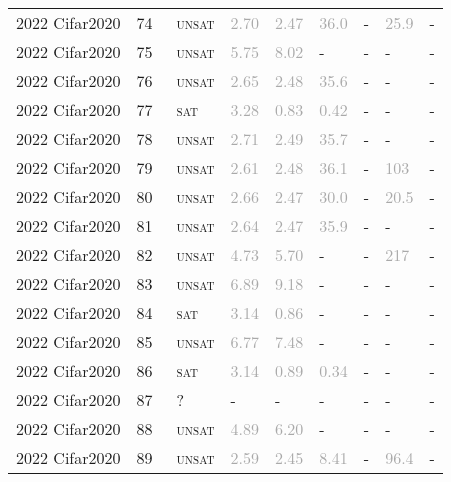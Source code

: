 \begin{center}
{\begin{longtable}{@{}lllllllll@{}}
2022 Cifar2020 & 74 & ~\textsc{unsat} & \textcolor{darkgray}{2.70} & \textcolor{darkgray}{2.47} & \textcolor{darkgray}{36.0} & - & \textcolor{darkgray}{25.9} & - \\
2022 Cifar2020 & 75 & ~\textsc{unsat} & \textcolor{darkgray}{5.75} & \textcolor{darkgray}{8.02} & - & - & - & - \\
2022 Cifar2020 & 76 & ~\textsc{unsat} & \textcolor{darkgray}{2.65} & \textcolor{darkgray}{2.48} & \textcolor{darkgray}{35.6} & - & - & - \\
2022 Cifar2020 & 77 & ~\textsc{sat} & \textcolor{darkgray}{3.28} & \textcolor{darkgray}{0.83} & \textcolor{darkgray}{0.42} & - & - & - \\
2022 Cifar2020 & 78 & ~\textsc{unsat} & \textcolor{darkgray}{2.71} & \textcolor{darkgray}{2.49} & \textcolor{darkgray}{35.7} & - & - & - \\
2022 Cifar2020 & 79 & ~\textsc{unsat} & \textcolor{darkgray}{2.61} & \textcolor{darkgray}{2.48} & \textcolor{darkgray}{36.1} & - & \textcolor{darkgray}{103} & - \\
2022 Cifar2020 & 80 & ~\textsc{unsat} & \textcolor{darkgray}{2.66} & \textcolor{darkgray}{2.47} & \textcolor{darkgray}{30.0} & - & \textcolor{darkgray}{20.5} & - \\
2022 Cifar2020 & 81 & ~\textsc{unsat} & \textcolor{darkgray}{2.64} & \textcolor{darkgray}{2.47} & \textcolor{darkgray}{35.9} & - & - & - \\
2022 Cifar2020 & 82 & ~\textsc{unsat} & \textcolor{darkgray}{4.73} & \textcolor{darkgray}{5.70} & - & - & \textcolor{darkgray}{217} & - \\
2022 Cifar2020 & 83 & ~\textsc{unsat} & \textcolor{darkgray}{6.89} & \textcolor{darkgray}{9.18} & - & - & - & - \\
2022 Cifar2020 & 84 & ~\textsc{sat} & \textcolor{darkgray}{3.14} & \textcolor{darkgray}{0.86} & - & - & - & - \\
2022 Cifar2020 & 85 & ~\textsc{unsat} & \textcolor{darkgray}{6.77} & \textcolor{darkgray}{7.48} & - & - & - & - \\
2022 Cifar2020 & 86 & ~\textsc{sat} & \textcolor{darkgray}{3.14} & \textcolor{darkgray}{0.89} & \textcolor{darkgray}{0.34} & - & - & - \\
2022 Cifar2020 & 87 & ~? & - & - & - & - & - & - \\
2022 Cifar2020 & 88 & ~\textsc{unsat} & \textcolor{darkgray}{4.89} & \textcolor{darkgray}{6.20} & - & - & - & - \\
2022 Cifar2020 & 89 & ~\textsc{unsat} & \textcolor{darkgray}{2.59} & \textcolor{darkgray}{2.45} & \textcolor{darkgray}{8.41} & - & \textcolor{darkgray}{96.4} & - \\

\end{longtable}}
\end{center}
